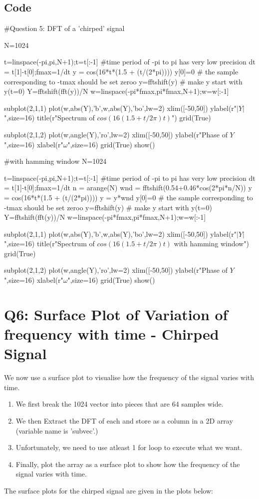 \documentclass[11pt]{article}
\begin{document}
\subsection{Code}
\begin{python}
#Question 5: DFT of a 'chirped' signal

N=1024

t=linspace(-pi,pi,N+1);t=t[:-1] #time period of -pi to pi has very low precision
dt = t[1]-t[0];fmax=1/dt
y = cos(16*t*(1.5 + (t/(2*pi))))
y[0]=0 # the sample corresponding to -tmax should be set zeroo
y=fftshift(y) # make y start with y(t=0)
Y=fftshift(fft(y))/N
w=linspace(-pi*fmax,pi*fmax,N+1);w=w[:-1]

subplot(2,1,1)
plot(w,abs(Y),'b',w,abs(Y),'bo',lw=2)
xlim([-50,50])
ylabel(r"$|Y|$",size=16)
title(r"Spectrum of $cos(16(1.5+t/2\pi)t)$")
grid(True)


subplot(2,1,2)
plot(w,angle(Y),'ro',lw=2)
xlim([-50,50])
ylabel(r"Phase of $Y$",size=16)
xlabel(r"$\omega$",size=16)
grid(True)
show()

#with hamming window
N=1024

t=linspace(-pi,pi,N+1);t=t[:-1] #time period of -pi to pi has very low precision
dt = t[1]-t[0];fmax=1/dt
n = arange(N)
wnd = fftshift(0.54+0.46*cos(2*pi*n/N))
y = cos(16*t*(1.5 + (t/(2*pi))))
y = y*wnd
y[0]=0 # the sample corresponding to -tmax should be set zeroo
y=fftshift(y) # make y start with y(t=0)
Y=fftshift(fft(y))/N
w=linspace(-pi*fmax,pi*fmax,N+1);w=w[:-1]

subplot(2,1,1)
plot(w,abs(Y),'b',w,abs(Y),'bo',lw=2)
xlim([-50,50])
ylabel(r"$|Y|$",size=16)
title(r"Spectrum of $cos(16(1.5+t/2\pi)t)$ with hamming window")
grid(True)


subplot(2,1,2)
plot(w,angle(Y),'ro',lw=2)
xlim([-50,50])
ylabel(r"Phase of $Y$",size=16)
xlabel(r"$\omega$",size=16)
grid(True)
show()
\end{python}

\section{Q6: Surface Plot of Variation of frequency with time - Chirped Signal}
We now use a surface plot to visualise how the frequency of the signal varies with time.
\begin{enumerate}
    \item We first break the 1024 vector into pieces that are 64 samples wide.
    \item We then Extract the DFT of each and store as a column in a 2D array (variable name is 'subvec'.)
    \item Unfortunately, we need to use atleast 1 for loop to execute what we want.
    \item Finally, plot the array as a surface plot to show how the frequency of the signal varies with time.
\end{enumerate}
The surface plots for the chirped signal are given in the plots below:
\end{document}

